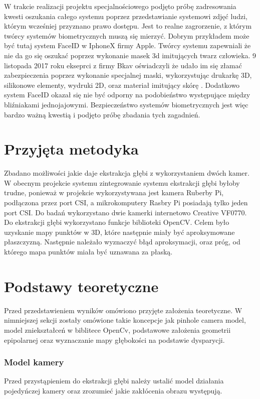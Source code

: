 \documentclass[oneside, eng]{mgr}
\begin{document}
W trakcie realizacji projektu specjalnościowego podjęto próbę zadresowania kwesti oszukania całego systemu poprzez przedstawianie systemowi zdjęć ludzi, którym wcześniej przyznano prawo dostępu. Jest to realne zagrorzenie, z którym twórcy systemów biometrycznych muszą się mierzyć. Dobrym przykładem może być tutaj system FaceID w IphoneX firmy Apple. Twórcy systemu zapewniali że nie da go się oszukać poprzez wykonanie masek 3d imitujących twarz człowieka. 9 listopada 2017 roku ekseprci z firmy Bkav oświadczyli że udało im się złamać zabezpieczenia poprzez wykonanie specjalnej maski, wykorzystując drukarkę 3D, silikonowe elementy, wydruki 2D, oraz materiał imitujący skórę \cite{FaceID hacked}. Dodatkowo system FaceID okazał się nie być odporny na podobieństwo występujące między bliźniakami jednojajowymi. Bezpieczeństwo systemów biometrycznych jest więc bardzo ważną kwestią i podjęto próbę zbadania tych zagadnień.

\section{Przyjęta metodyka}
Zbadano możliwości jakie daje ekstrakcja głębi z wykorzystaniem dwóch kamer. W obecnym projekcie systemu zintegrowanie systemu ekstrakcji głębi byłoby trudne, ponieważ w projekcie wykorzystywana jest kamera Ruberby Pi, podłączona przez port CSI, a mikrokomputery Rasbry Pi posiadają tylko jeden port CSI. Do badań wykorzystano dwie kamerki internetowo Creative VF0770. Do ekstrakcji głębi wykorzystano funkcje biblioteki OpenCV. Celem było uzyskanie mapy punktów w 3D, które następnie miały być aproksymowane płaszczyzną. Następnie należało wyznaczyć błąd aproksymacji, oraz próg, od którego mapa punktów miała być uznawana za płaską.

\section{Podstawy teoretyczne}

Przed przedstawieniem wyników omówiono przyjęte założenia teoretyczne. W nimniejszej sekcji zostały omówione takie koncepcje jak pinhole camera model, model zniekształceń w biblitece OpenCv, podstawowe założenia geometrii epipolarnej oraz wyznaczanie mapy głębokości na podstawie dysparycji.

\subsubsection{Model kamery}
Przed przystąpieniem do ekstrakcji głębi należy ustalić model działania pojedyńczej kamery oraz zrozumieć jakie zakłócenia obrazu występują.
\end{document}
